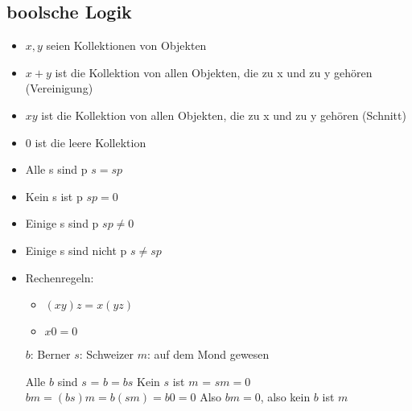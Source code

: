 \documentclass[../main.tex]{subfiles}
\begin{document}
\subsection{boolsche Logik}
\begin{itemize}
  \item $x, y$ seien Kollektionen von Objekten
  \item $x + y$ ist die Kollektion von allen Objekten, die zu x und 
  zu y gehören (Vereinigung)
  \item $xy$ ist die Kollektion von allen Objekten, die zu x und zu y gehören (Schnitt)
  \item $0$ ist die leere Kollektion
\end{itemize}
\begin{itemize}
  \item Alle s sind p $s = sp$
  \item Kein s ist p $sp = 0$
  \item Einige s sind p $sp \neq 0$
  \item Einige s sind nicht p $s \neq sp$
  \item Rechenregeln: 
  \begin{itemize}
    \item[] $(xy)z = x(yz)$
    \item[] $x0 = 0$
  \end{itemize}
  \begin{example}\newline
      $b$: Berner \newline
      $s$: Schweizer\newline
      $m$: auf dem Mond gewesen\newline\newline

      Alle $b$ sind $s$ = $b = bs$\newline
      Kein $s$ ist $m$ = $sm=0$\newline\newline
      $bm=(bs)m=b(sm)=b0=0$\newline
      Also $bm=0$, also kein $b$ ist $m$
    \end{example}  
\end{itemize}
\end{document}

